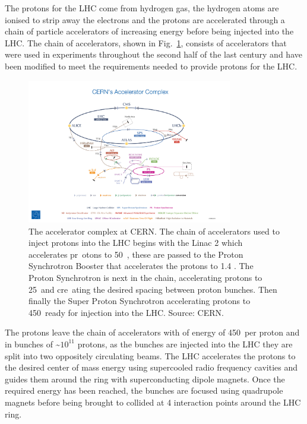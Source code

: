 The protons for the LHC come from hydrogen gas, %
the hydrogen atoms are ionised to strip away the electrons and the protons are accelerated through a chain of particle accelerators of increasing energy before being injected into the LHC. The chain of accelerators, shown in Fig.~\ref{fig:accelerator_chain}, consists of accelerators that were used in experiments throughout the second half of the last century and have been modified to meet the requirements needed to provide protons for the LHC. 
\begin{figure}[htbp!]
  \centering
  \includegraphics[trim = 125mm 2mm 125mm 90mm, clip, width=0.8\textwidth]{./Figs/LHC_LHCb/accelerator_complex.jpg}
  \caption{The accelerator complex at CERN. The chain of accelerators used to inject protons into the LHC begins with the Linac 2 which accelerates pr\
otons to 50~\mev, these are passed to the Proton Synchrotron Booster that accelerates the protons to 1.4 \gev. The Proton Synchrotron is next in the chain, accelerating protons to 25~\gev and cre\
ating the desired spacing between proton bunches. Then finally the Super Proton Synchrotron accelerating protons to 450~\gev ready for injection into the LHC. Source: CERN.}
  \label{fig:accelerator_chain}
\end{figure}



The protons leave the chain of accelerators with of energy of 450~\gev per proton and in bunches of \~$10^{11}$ protons, as the bunches are injected into the LHC they are split into two oppositely circulating beams.
The LHC accelerates the protons to the desired center of mass energy using supercooled radio frequency cavities and guides them around the ring with superconducting dipole magnets. %
Once the required energy has been reached, the bunches are focused using quadrupole magnets before being brought to collided at 4 interaction points around the LHC ring.%

